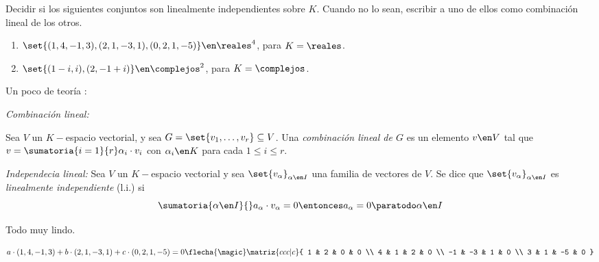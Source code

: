 \begin{enunciado}{\ejercicio}
  Decidir si los siguientes conjuntos son linealmente independientes sobre $K$. Cuando no lo sean,
  escribir a uno de ellos como combinación lineal de los otros.
  \begin{enumerate}[label=\alph*)]
    \item $\set{(1,4,-1,3), (2,1,-3,1),(0,2,1,-5)} \en \reales^4$, para $K = \reales$.
    \item $\set{(1 - i, i), (2,-1 + i)} \en \complejos^2$, para $K = \complejos$.
  \end{enumerate}
\end{enunciado}

Un poco de teoría \rollingEyes:

\textit{Combinación lineal:}

Sea $V$ un $K-$espacio vectorial, y sea $G = \set{v_1,\ldots,v_r} \subseteq V$.
Una \textit{combinación lineal de $G$} es un elemento $v \en V$ tal que $v = \sumatoria{i=1}{r} \alpha_i \cdot v_i$ con
$\alpha_i \en K$ para cada $1 \leq i \leq r$.

\textit{Independecia lineal:}
Sea $V$ un $K-$espacio vectorial y sea $\set{v_\alpha}_{\alpha \en I}$ una familia de vectores de $V$. Se
dice que  $\set{v_{\alpha}}_{\alpha \en I}$ es \textit{linealmente independiente} (l.i.) si
$$
  \sumatoria{\alpha \en I}{} a_{\alpha} \cdot v_{\alpha} = 0 \entonces a_{\alpha} = 0 \paratodo \alpha \en I
$$

\bigskip

Todo muy lindo.

\bigskip

$$
  a \cdot (1,4,-1,3) + b \cdot (2,1,-3,1) + c\cdot (0,2,1,-5) = 0
  \flecha{\magic}
  \matriz{ccc|c}{
    1 & 2 & 0 & 0 \\
    4 & 1 & 2 & 0 \\
    -1 & -3 & 1 & 0 \\
    3 & 1 & -5 & 0
  }
$$

